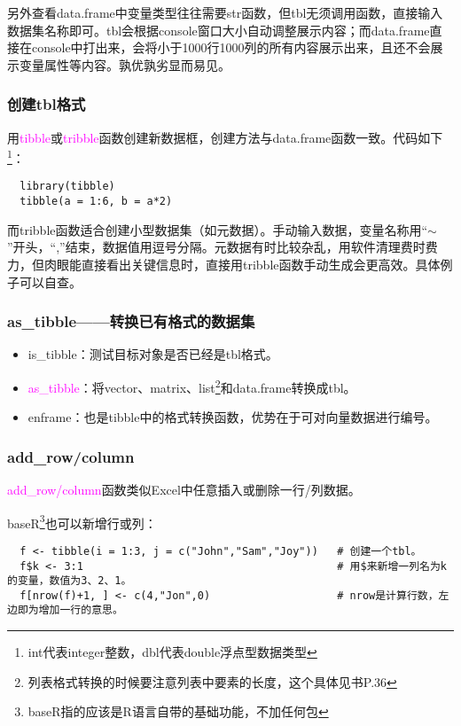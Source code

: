 \documentclass[cn,hazy,blue,14pt,screen]{elegantnote}
\begin{document}
另外查看data.frame中变量类型往往需要str函数，但tbl无须调用函数，直接输入数据集名称即可。tbl会根据console窗口大小自动调整展示内容；而data.frame直接在console中打出来，会将小于1000行1000列的所有内容展示出来，且还不会展示变量属性等内容。孰优孰劣显而易见。

\subsubsection{创建tbl格式}

用\textcolor{magenta}{tibble}或\textcolor{magenta}{tribble}函数创建新数据框，创建方法与data.frame函数一致。代码如下\footnote{int代表integer整数，dbl代表double浮点型数据类型}：

\begin{lstlisting}
  library(tibble)
  tibble(a = 1:6, b = a*2)
\end{lstlisting}

而tribble函数适合创建小型数据集（如元数据）。手动输入数据，变量名称用“$\sim$”开头，“,”结束，数据值用逗号分隔。元数据有时比较杂乱，用软件清理费时费力，但肉眼能直接看出关键信息时，直接用tribble函数手动生成会更高效。具体例子可以自查。

\subsubsection{as\_tibble——转换已有格式的数据集}

\begin{itemize}
  \item is\_tibble：测试目标对象是否已经是tbl格式。
  \item \textcolor{magenta}{as\_tibble}：将vector、matrix、list\footnote{列表格式转换的时候要注意列表中要素的长度，这个具体见书P.36}和data.frame转换成tbl。
  \item enframe：也是tibble中的格式转换函数，优势在于可对向量数据进行编号。
\end{itemize}

\subsubsection{add\_row/column}

\textcolor{magenta}{add\_row/column}函数类似Excel中任意插入或删除一行/列数据。

baseR\footnote{baseR指的应该是R语言自带的基础功能，不加任何包}也可以新增行或列：

\begin{lstlisting}
  f <- tibble(i = 1:3, j = c("John","Sam","Joy"))   # 创建一个tbl。
  f$k <- 3:1                                        # 用$来新增一列名为k的变量，数值为3、2、1。
  f[nrow(f)+1, ] <- c(4,"Jon",0)                    # nrow是计算行数，左边即为增加一行的意思。
\end{lstlisting}
\end{document}
